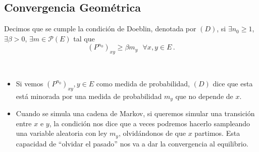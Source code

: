 \subsection{Convergencia Geométrica}
\begin{definition}
Decimos que se cumple la condición de Doeblin, denotada por $(D)$, si $\exists n_0\geq1$, $\exists\beta>0$, $\exists m\in\mathcal{P}(E)$ tal que
$$(P^{n_0})_{xy}\geq\beta m_y \mbox{ }\forall x,y\in E \, .$$
\end{definition}
\vspace{.5cm} \\
\begin{remark}
\beforeitemize
\begin{itemize}
    \item  Si vemos $(P^{n_0})_{xy},y\in E$ como medida de probabilidad, $(D)$ dice que esta está minorada por una medida de probabilidad $m_y$ que no depende de $x$.
    \item Cuando se simula una cadena de Markov, si queremos simular una transición entre $x$ e $y$, la condición nos dice que a veces podremos hacerlo sampleando una variable aleatoria con ley $m_y$, olvidándonos de que $x$ partimos. Esta capacidad de ``olvidar el pasado'' nos va a dar la convergencia al equilibrio.
\end{itemize}
\end{remark}

